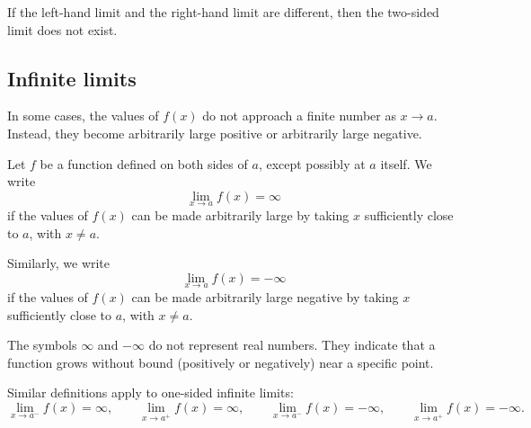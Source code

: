 \begin{remark}
If the left-hand limit and the right-hand limit are different, then the two-sided limit does not exist.
\end{remark}

\subsection{Infinite limits}

In some cases, the values of \(f(x)\) do not approach a finite number as \(x\to a\). Instead, they become arbitrarily large positive or arbitrarily large negative.

\begin{definition}
Let \(f\) be a function defined on both sides of \(a\), except possibly at \(a\) itself. We write
\[
\lim_{x\to a}f(x)=\infty
\]
if the values of \(f(x)\) can be made arbitrarily large by taking \(x\) sufficiently close to \(a\), with \(x\ne a\).

Similarly, we write
\[
\lim_{x\to a}f(x)=-\infty
\]
if the values of \(f(x)\) can be made arbitrarily large negative by taking \(x\) sufficiently close to \(a\), with \(x\ne a\).
\end{definition}

\begin{remark}
The symbols \(\infty\) and \(-\infty\) do not represent real numbers. They indicate that a function grows without bound (positively or negatively) near a specific point.
\end{remark}

Similar definitions apply to one-sided infinite limits:
\[
\lim_{x\to a^-}f(x)=\infty,
\qquad
\lim_{x\to a^+}f(x)=\infty,
\qquad
\lim_{x\to a^-}f(x)=-\infty,
\qquad
\lim_{x\to a^+}f(x)=-\infty.
\]

